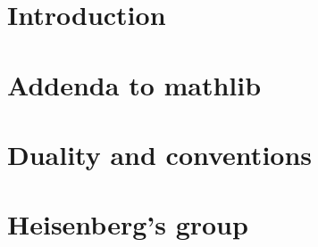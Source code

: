 %

\chapter*{Introduction}
    

\chapter{Addenda to mathlib}
   

\chapter{Duality and conventions}
    

\chapter{Heisenberg's group}
    